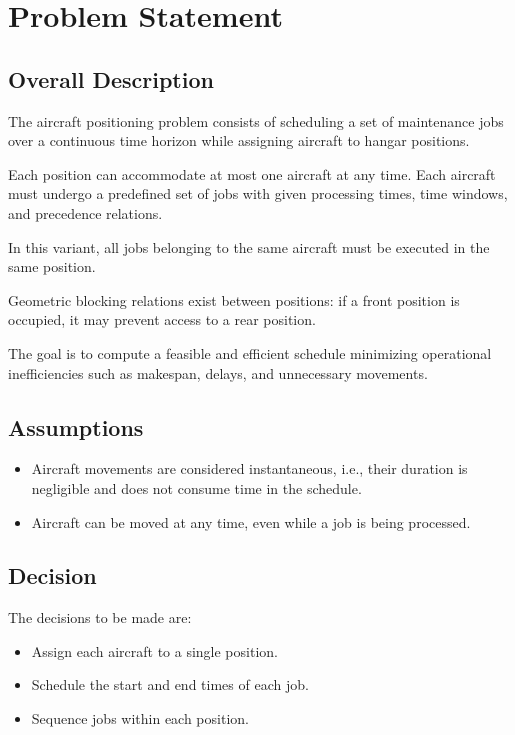 \section*{Problem Statement}

\subsection*{Overall Description}

The aircraft positioning problem consists of scheduling a set of maintenance jobs over a continuous time horizon while assigning aircraft to hangar positions.

Each position can accommodate at most one aircraft at any time. Each aircraft must undergo a predefined set of jobs with given processing times, time windows, and precedence relations.

In this variant, all jobs belonging to the same aircraft must be executed in the same position.

Geometric blocking relations exist between positions: if a front position is occupied, it may prevent access to a rear position.

The goal is to compute a feasible and efficient schedule minimizing operational inefficiencies such as makespan, delays, and unnecessary movements.

\subsection*{Assumptions}

\begin{itemize}
    \item Aircraft movements are considered instantaneous, i.e., their duration is negligible and does not consume time in the schedule.
    \item Aircraft can be moved at any time, even while a job is being processed.
\end{itemize}

\subsection*{Decision}

The decisions to be made are:

\begin{itemize}
    \item Assign each aircraft to a single position.
    \item Schedule the start and end times of each job.
    \item Sequence jobs within each position.
\end{itemize}

